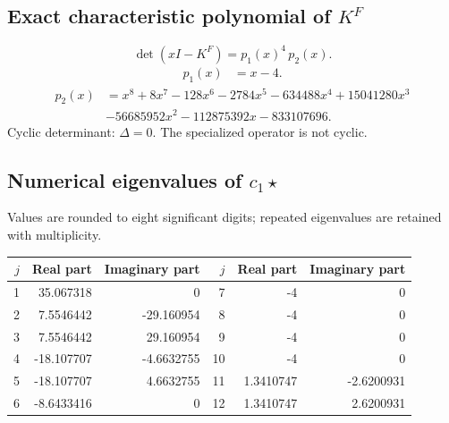 \documentclass[10pt,a4paper]{article}
\begin{document}
\subsection*{Exact characteristic polynomial of $K^F$}
\[\det(xI-K^F)=p_{1}(x)^{4}\,p_{2}(x).\]
\[\begin{aligned}p_{1}(x)&=x - 4.\end{aligned}\]
\[\begin{aligned}p_{2}(x)&=x^{8} + 8 x^{7} - 128 x^{6} - 2784 x^{5} - 634488 x^{4} + 15041280 x^{3}\\&- 56685952 x^{2} - 112875392 x - 833107696.\end{aligned}\]
Cyclic determinant: $\Delta=0$. The specialized operator is not cyclic.
\subsection*{Numerical eigenvalues of $c_1\star$}
Values are rounded to eight significant digits; repeated eigenvalues are retained with multiplicity.
\begin{center}\small\begin{tabular}{rrr@{\qquad}rrr}\toprule $j$ & Real part & Imaginary part & $j$ & Real part & Imaginary part\\\midrule
1 & 35.067318 & 0 & 7 & -4 & 0\\
2 & 7.5546442 & -29.160954 & 8 & -4 & 0\\
3 & 7.5546442 & 29.160954 & 9 & -4 & 0\\
4 & -18.107707 & -4.6632755 & 10 & -4 & 0\\
5 & -18.107707 & 4.6632755 & 11 & 1.3410747 & -2.6200931\\
6 & -8.6433416 & 0 & 12 & 1.3410747 & 2.6200931\\
\bottomrule\end{tabular}\end{center}
\end{document}
